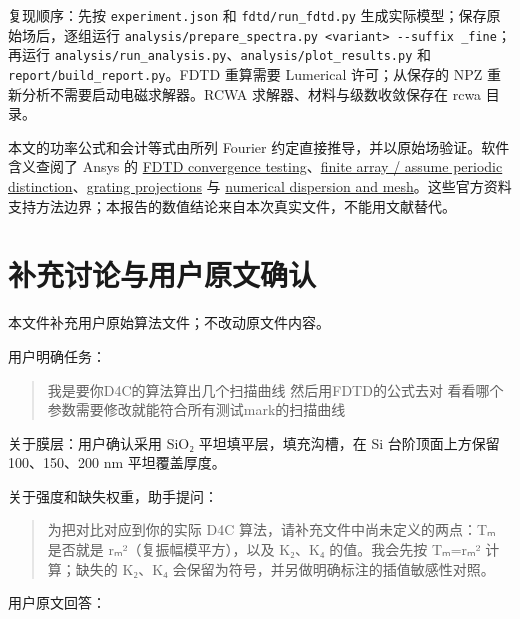 \documentclass[
  chinese,
  UTF8,
  a4paper,
  11pt]{ctexart}
\begin{document}
复现顺序：先按 \texttt{experiment.json} 和 \texttt{fdtd/run\_fdtd.py}
生成实际模型；保存原始场后，逐组运行
\texttt{analysis/prepare\_spectra.py\ \textless{}variant\textgreater{}\ -\/-suffix\ \_fine}；再运行
\texttt{analysis/run\_analysis.py}、\texttt{analysis/plot\_results.py}
和 \texttt{report/build\_report.py}。FDTD 重算需要 Lumerical
许可；从保存的 NPZ 重新分析不需要启动电磁求解器。RCWA
求解器、材料与级数收敛保存在 rcwa 目录。

本文的功率公式和会计等式由所列 Fourier
约定直接推导，并以原始场验证。软件含义查阅了 Ansys 的
\href{https://optics.ansys.com/hc/en-us/articles/360034915833-Convergence-testing-process-for-FDTD-simulations}{FDTD
convergence
testing}、\href{https://optics.ansys.com/hc/en-us/articles/360034914793-Understanding-the-Assume-Periodic-option-in-far-field-projections}{finite
array / assume periodic
distinction}、\href{https://optics.ansys.com/hc/en-us/articles/360034394354-Grating-projections-in-FDTD-overview}{grating
projections} 与
\href{https://optics.ansys.com/hc/en-us/articles/360034382634-Understanding-the-non-uniform-mesh-in-FDTD}{numerical
dispersion and
mesh}。这些官方资料支持方法边界；本报告的数值结论来自本次真实文件，不能用文献替代。

\section{补充讨论与用户原文确认}\label{ux8865ux5145ux8ba8ux8bbaux4e0eux7528ux6237ux539fux6587ux786eux8ba4}

本文件补充用户原始算法文件；不改动原文件内容。

用户明确任务：

\begin{quote}
我是要你D4C的算法算出几个扫描曲线 然后用FDTD的公式去对
看看哪个参数需要修改就能符合所有测试mark的扫描曲线
\end{quote}

关于膜层：用户确认采用 SiO₂ 平坦填平层，填充沟槽，在 Si 台阶顶面上方保留
100、150、200 nm 平坦覆盖厚度。

关于强度和缺失权重，助手提问：

\begin{quote}
为把对比对应到你的实际 D4C 算法，请补充文件中尚未定义的两点：Tₘ 是否就是
\textbar rₘ\textbar²（复振幅模平方），以及 K₂、K₄ 的值。我会先按
Tₘ=\textbar rₘ\textbar² 计算；缺失的 K₂、K₄
会保留为符号，并另做明确标注的插值敏感性对照。
\end{quote}

用户原文回答：
\end{document}
